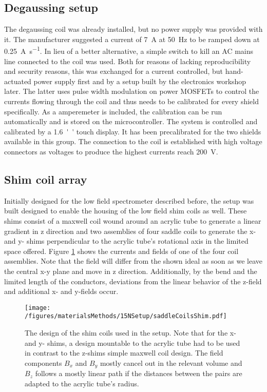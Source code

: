         \subsection{Degaussing setup}
        \label{sec:matMeth:degaussing}
        The degaussing coil was already installed, but no power supply was provided with it. The manufacturer suggested a current of \SI{7}{\ampere} at \SI{50}{\hertz} to be ramped down at \SI{0.25}{\ampere\per\second}. In lieu of a better alternative, a simple switch to kill an AC mains line connected to the coil was used. Both for reasons of lacking reproducibility and security reasons, this was exchanged for a current controlled, but hand-actuated power supply first and by a setup built by the electronics workshop later. The latter uses pulse width modulation on power MOSFETs to control the currents flowing through the coil and thus needs to be calibrated for every shield specifically. As a amperemeter is included, the calibration can be run automatically and is stored on the microcontroller. The system is controlled and calibrated by a \SI{1.6}{''} touch display. It has been precalibrated for the two shields available in this group. The connection to the coil is established with high voltage connectors as voltages to produce the highest currents reach \SI{200}{\volt}.
        \subsection{Shim coil array}
        Initially designed for the low field spectrometer described before, the setup was built designed to enable the housing of the low field shim coils as well. These shims consist of a maxwell coil wound around an acrylic tube to generate a linear gradient in z direction and two assemblies of four saddle coils to generate the x- and y- shims perpendicular to the acrylic tube's rotational axis in the limited space offered.
        Figure \ref{figure:matMeth:shimCoilArray} shows the currents and fields of one of the four coil assemblies. Note that the field will differ from the shown ideal as soon as we leave the central x-y plane and move in z direction. Additionally, by the bend and the limited length of the conductors, deviations from the linear behavior of the z-field and additional x- and y-fields occur.
        \begin{figure}
            \label{figure:matMeth:shimCoilArray}
            \texttt{[image: /figures/materialsMethods/15NSetup/saddleCoilsShim.pdf]}
            \caption[Shim coil design]{The design of the shim coils used in the setup. Note that for the x- and y- shims, a design mountable to the acrylic tube had to be used in contrast to the z-shims simple maxwell coil design. The field components $B_x$ and $B_y$ mostly cancel out in the relevant volume and $B_z$ follows a mostly linear path if the distances between the pairs are adapted to the acrylic tube's radius.}
        \end{figure}
